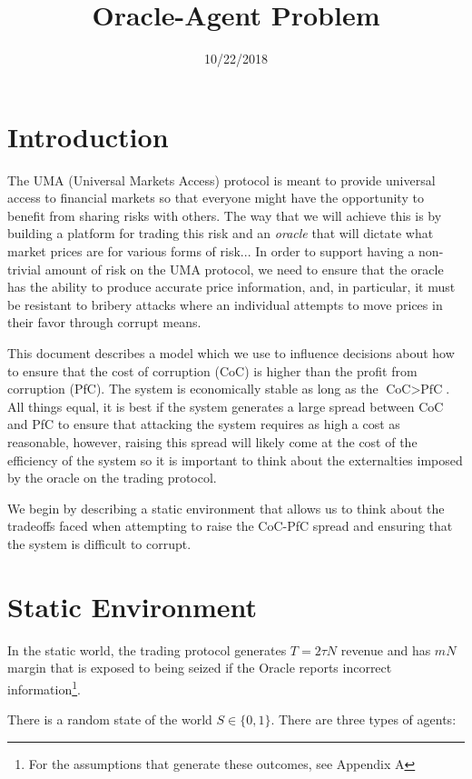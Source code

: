 \documentclass[12pt]{article}
\title{Oracle-Agent Problem}
\author{}
\date{10/22/2018}
\begin{document}
\maketitle


\section{Introduction}

  The UMA (Universal Markets Access) protocol is meant to provide universal access to financial
  markets so that everyone might have the opportunity to benefit from sharing risks with others. The
  way that we will achieve this is by building a platform for trading this risk and an
  \textit{oracle} that will dictate what market prices are for various forms of risk... In order to
  support having a non-trivial amount of risk on the UMA protocol, we need to ensure that the oracle
  has the ability to produce accurate price information, and, in particular, it must be resistant to
  bribery attacks where an individual attempts to move prices in their favor through corrupt means.

  This document describes a model which we use to influence decisions about how to ensure that the
  cost of corruption (CoC) is higher than the profit from corruption (PfC). The system is
  economically stable as long as the $\text{CoC} > \text{PfC}$. All things equal, it is best if the
  system generates a large spread between CoC and PfC to ensure that attacking the system requires
  as high a cost as reasonable, however, raising this spread will likely come at the cost of the
  efficiency of the system so it is important to think about the externalties imposed by the oracle
  on the trading protocol.

  We begin by describing a static environment that allows us to think about the tradeoffs faced when
  attempting to raise the CoC-PfC spread and ensuring that the system is difficult to corrupt.


\section{Static Environment}

  In the static world, the trading protocol generates $T = 2 \tau N$ revenue and has $mN$ margin
  that is exposed to being seized if the Oracle reports incorrect information\footnote{For the
  assumptions that generate these outcomes, see Appendix A}.

  There is a random state of the world $S \in \{0, 1\}$. There are three types of agents:
\end{document}
